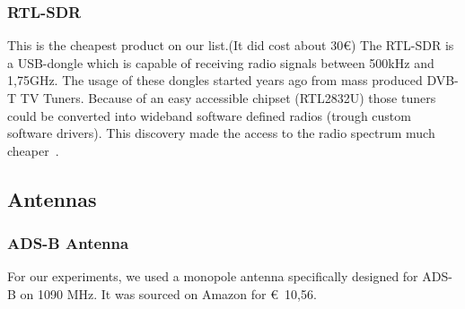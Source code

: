 \documentclass[conference]{IEEEtran}
\begin{document}
\subsubsection{RTL-SDR}
This is the cheapest product on our list.(It did cost about 30€) The RTL-SDR is a USB-dongle which is capable of receiving radio signals  between 500kHz and 1,75GHz.  The  usage of these dongles started years ago from mass produced DVB-T TV Tuners. Because of an easy accessible chipset (RTL2832U) those tuners could be converted into wideband software defined radios (trough custom software drivers). This discovery made the access to the radio spectrum much cheaper~\cite{rtl-sdr}.

\subsection{Antennas}
\subsubsection{ADS-B Antenna}
For our experiments, we used a monopole antenna specifically designed for ADS-B on 1090 MHz. It was sourced on Amazon for €~10,56.
\end{document}
